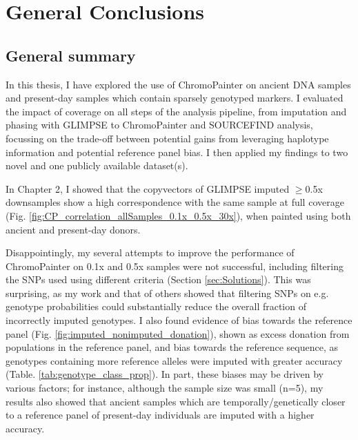\chapter{General Conclusions}
\label{chapterlabelConclusions}

\section{General summary}

In this thesis, I have explored the use of ChromoPainter on ancient DNA samples and present-day samples which contain sparsely genotyped markers. I evaluated the impact of coverage on all steps of the analysis pipeline, from imputation and phasing with GLIMPSE \cite{rubinacci2021efficient} to ChromoPainter and SOURCEFIND analysis, focussing on the trade-off between potential gains from leveraging haplotype information and potential reference panel bias. I then applied my findings to two novel and one publicly available dataset(s). 

In Chapter 2, I showed that the copyvectors of GLIMPSE imputed $\geq$0.5x downsamples show a high correspondence with the same sample at full coverage (Fig. \ref{fig:CP_correlation_allSamples_0.1x_0.5x_30x}), when painted using both ancient and present-day donors. 

Disappointingly, my several attempts to improve the performance of ChromoPainter on 0.1x and 0.5x samples were not successful, including filtering the SNPs used using different criteria (Section \ref{sec:Solutions}). This was surprising, as my work and that of others \cite{hui2020evaluating} showed that filtering SNPs on e.g. genotype probabilities could substantially reduce the overall fraction of incorrectly imputed genotypes. I also found evidence of bias towards the reference panel (Fig. \ref{fig:imputed_nonimputed_donation}), shown as excess donation from populations in the reference panel, and bias towards the reference sequence, as genotypes containing more reference alleles were imputed with greater accuracy (Table. \ref{tab:genotype_class_prop}). In part, these biases may be driven by various factors; for instance, although the sample size was small (n=5), my results also showed that ancient samples which are temporally/genetically closer to a reference panel of present-day individuals are imputed with a higher accuracy.


